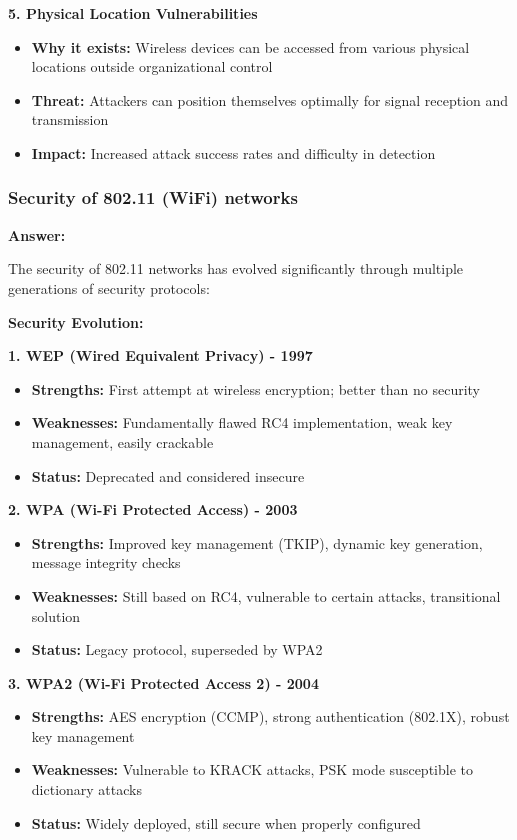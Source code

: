\documentclass[12pt,a4paper]{article}
\begin{document}
\textbf{5. Physical Location Vulnerabilities}
\begin{itemize}
    \item \textbf{Why it exists:} Wireless devices can be accessed from various physical locations outside organizational control
    \item \textbf{Threat:} Attackers can position themselves optimally for signal reception and transmission
    \item \textbf{Impact:} Increased attack success rates and difficulty in detection
\end{itemize}

\subsubsection{Security of 802.11 (WiFi) networks}

\textbf{Answer:}

The security of 802.11 networks has evolved significantly through multiple generations of security protocols:

\textbf{Security Evolution:}

\textbf{1. WEP (Wired Equivalent Privacy) - 1997}
\begin{itemize}
    \item \textbf{Strengths:} First attempt at wireless encryption; better than no security
    \item \textbf{Weaknesses:} Fundamentally flawed RC4 implementation, weak key management, easily crackable
    \item \textbf{Status:} Deprecated and considered insecure
\end{itemize}

\textbf{2. WPA (Wi-Fi Protected Access) - 2003}
\begin{itemize}
    \item \textbf{Strengths:} Improved key management (TKIP), dynamic key generation, message integrity checks
    \item \textbf{Weaknesses:} Still based on RC4, vulnerable to certain attacks, transitional solution
    \item \textbf{Status:} Legacy protocol, superseded by WPA2
\end{itemize}

\textbf{3. WPA2 (Wi-Fi Protected Access 2) - 2004}
\begin{itemize}
    \item \textbf{Strengths:} AES encryption (CCMP), strong authentication (802.1X), robust key management
    \item \textbf{Weaknesses:} Vulnerable to KRACK attacks, PSK mode susceptible to dictionary attacks
    \item \textbf{Status:} Widely deployed, still secure when properly configured
\end{itemize}
\end{document}
